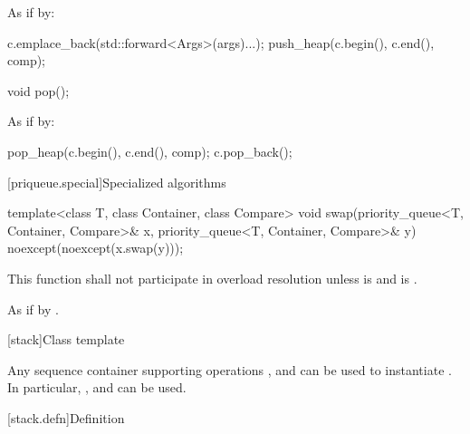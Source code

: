 \begin{itemdescr}
\pnum
\effects
As if by:
\begin{codeblock}
c.emplace_back(std::forward<Args>(args)...);
push_heap(c.begin(), c.end(), comp);
\end{codeblock}
\end{itemdescr}


%
\begin{itemdecl}
void pop();
\end{itemdecl}

\begin{itemdescr}
\pnum
\effects
As if by:
\begin{codeblock}
pop_heap(c.begin(), c.end(), comp);
c.pop_back();
\end{codeblock}
\end{itemdescr}

[priqueue.special]{Specialized algorithms}

%
\begin{itemdecl}
template<class T, class Container, class Compare>
  void swap(priority_queue<T, Container, Compare>& x,
            priority_queue<T, Container, Compare>& y) noexcept(noexcept(x.swap(y)));
\end{itemdecl}

\begin{itemdescr}
\pnum
\remarks
This function shall not participate in overload resolution
unless  is  and
 is .

\pnum
\effects As if by .
\end{itemdescr}

[stack]{Class template }

\pnum
{}%
Any sequence container supporting operations
,
and
can be used to instantiate
.
In particular,
,
and
can be used.

[stack.defn]{Definition}

